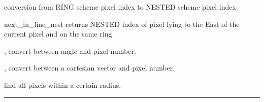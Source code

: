 \newpage
\begin{modules}
  \begin{sulist}{} %
 \item[\htmlref{ring2nest}{sub:pix_tools}] conversion from RING scheme pixel index to NESTED scheme pixel index
 \item[next\_in\_line\_nest] returns NESTED index of pixel lying to the East of the
 current pixel and on the same ring
  \end{sulist}
\end{modules}

\begin{related}
  \begin{sulist}{} %
  \item[\htmlref{pix2ang}{sub:pix_tools}, \htmlref{ang2pix}{sub:pix_tools}] convert between angle and pixel number.
  \item[\htmlref{pix2vec}{sub:pix_tools}, \htmlref{vec2pix}{sub:pix_tools}] convert between a cartesian vector and pixel number.
  \item[\htmlref{getdisc\_ring}{sub:getdisc_ring}] find all pixels within a certain radius.
  \end{sulist}
\end{related}

\rule{\hsize}{2mm}

\newpage
